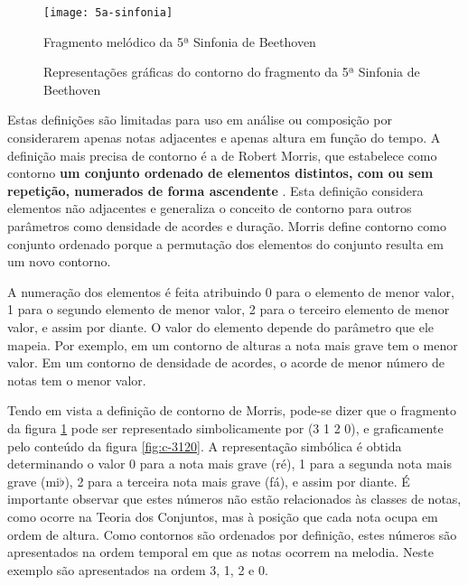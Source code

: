 \begin{figure}
  \centering
  \texttt{[image: 5a-sinfonia]}
  \caption{Fragmento melódico da 5ª Sinfonia de Beethoven}
  \label{fig:5a-sinfonia}
\end{figure}

\begin{figure}
  \centering
  \subfloat[(- + -)]{
    \texttt{[image: c-1010]}
    \label{fig:c-1010}
  }
  \quad
  \subfloat[(3 1 2 0)]{
    \texttt{[image: c-3120]}
    \label{fig:c-3120}
  }
  \caption{Representações gráficas do contorno do fragmento da 5ª
    Sinfonia de Beethoven}
  \label{fig:repr-5a-sinfonia}
\end{figure}

Estas definições são limitadas para uso em análise ou composição por
considerarem apenas notas adjacentes e apenas altura em função do
tempo. A definição mais precisa de contorno é a de Robert Morris, que
estabelece como contorno \textbf{um conjunto ordenado de elementos
  distintos, com ou sem repetição, numerados de forma ascendente}
\cite[p. 206]{morris93:directions}. Esta definição considera elementos
não adjacentes e generaliza o conceito de contorno para outros
parâmetros como densidade de acordes e duração. Morris define contorno
como conjunto ordenado porque a permutação dos elementos do conjunto
resulta em um novo contorno.

A numeração dos elementos é feita atribuindo 0 para o elemento de
menor valor, 1 para o segundo elemento de menor valor, 2 para o
terceiro elemento de menor valor, e assim por diante. O valor do
elemento depende do parâmetro que ele mapeia. Por exemplo, em um
contorno de alturas a nota mais grave tem o menor valor. Em um
contorno de densidade de acordes, o acorde de menor número de notas
tem o menor valor.

Tendo em vista a definição de contorno de Morris, pode-se dizer que o
fragmento da figura \ref{fig:5a-sinfonia} pode ser representado
simbolicamente por (3 1 2 0), e graficamente pelo conteúdo da figura
\ref{fig:c-3120}. A representação simbólica é obtida determinando o
valor 0 para a nota mais grave (ré), 1 para a segunda nota mais grave
(mi$\flat$), 2 para a terceira nota mais grave (fá), e assim por
diante. É importante observar que estes números não estão relacionados
às classes de notas, como ocorre na Teoria dos Conjuntos, mas à
posição que cada nota ocupa em ordem de altura. Como contornos são
ordenados por definição, estes números são apresentados na ordem
temporal em que as notas ocorrem na melodia. Neste exemplo são
apresentados na ordem 3, 1, 2 e 0.


